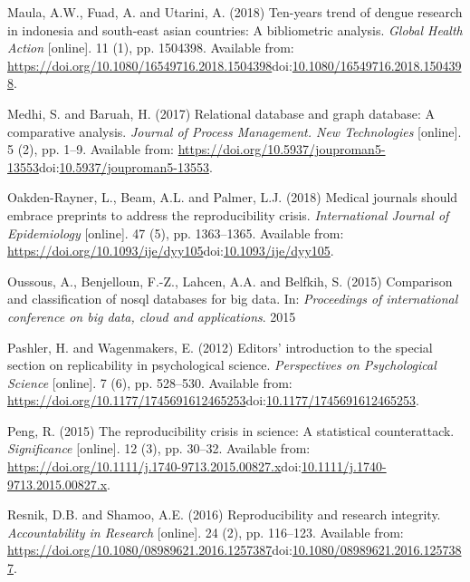 \documentclass[]{article}
\begin{document}
\leavevmode\hypertarget{ref-Maula2018}{}%
Maula, A.W., Fuad, A. and Utarini, A. (2018) Ten-years trend of dengue
research in indonesia and south-east asian countries: A bibliometric
analysis. \emph{Global Health Action} {[}online{]}. 11 (1), pp. 1504398.
Available from:
\url{https://doi.org/10.1080/16549716.2018.1504398}doi:\href{https://doi.org/10.1080/16549716.2018.1504398}{10.1080/16549716.2018.1504398}.

\leavevmode\hypertarget{ref-Medhi2017}{}%
Medhi, S. and Baruah, H. (2017) Relational database and graph database:
A comparative analysis. \emph{Journal of Process Management. New
Technologies} {[}online{]}. 5 (2), pp. 1--9. Available from:
\url{https://doi.org/10.5937/jouproman5-13553}doi:\href{https://doi.org/10.5937/jouproman5-13553}{10.5937/jouproman5-13553}.

\leavevmode\hypertarget{ref-OakdenRayner2018}{}%
Oakden-Rayner, L., Beam, A.L. and Palmer, L.J. (2018) Medical journals
should embrace preprints to address the reproducibility crisis.
\emph{International Journal of Epidemiology} {[}online{]}. 47 (5), pp.
1363--1365. Available from:
\url{https://doi.org/10.1093/ije/dyy105}doi:\href{https://doi.org/10.1093/ije/dyy105}{10.1093/ije/dyy105}.

\leavevmode\hypertarget{ref-Oussous2015}{}%
Oussous, A., Benjelloun, F.-Z., Lahcen, A.A. and Belfkih, S. (2015)
Comparison and classification of nosql databases for big data. In:
\emph{Proceedings of international conference on big data, cloud and
applications}. 2015

\leavevmode\hypertarget{ref-Pashler2012}{}%
Pashler, H. and Wagenmakers, E. (2012) Editors' introduction to the
special section on replicability in psychological science.
\emph{Perspectives on Psychological Science} {[}online{]}. 7 (6), pp.
528--530. Available from:
\url{https://doi.org/10.1177/1745691612465253}doi:\href{https://doi.org/10.1177/1745691612465253}{10.1177/1745691612465253}.

\leavevmode\hypertarget{ref-Peng2015}{}%
Peng, R. (2015) The reproducibility crisis in science: A statistical
counterattack. \emph{Significance} {[}online{]}. 12 (3), pp. 30--32.
Available from:
\url{https://doi.org/10.1111/j.1740-9713.2015.00827.x}doi:\href{https://doi.org/10.1111/j.1740-9713.2015.00827.x}{10.1111/j.1740-9713.2015.00827.x}.

\leavevmode\hypertarget{ref-Resnik2016}{}%
Resnik, D.B. and Shamoo, A.E. (2016) Reproducibility and research
integrity. \emph{Accountability in Research} {[}online{]}. 24 (2), pp.
116--123. Available from:
\url{https://doi.org/10.1080/08989621.2016.1257387}doi:\href{https://doi.org/10.1080/08989621.2016.1257387}{10.1080/08989621.2016.1257387}.
\end{document}
